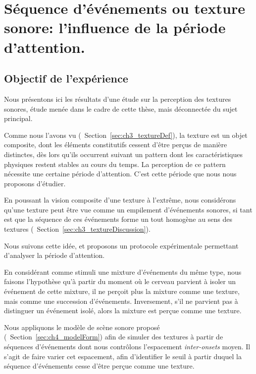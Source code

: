 \chapter[Expérience annexe: période d'attention]{Séquence d'événements ou texture sonore: l'influence de la période d'attention.}
\label{app:xp_texture}


\section{Objectif de l'expérience}

Nous présentons ici les résultats d'une étude sur la perception des textures sonores, étude menée dans le cadre de cette thèse, mais déconnectée du sujet principal. 

Comme nous l'avons vu (\cf~Section~\ref{sec:ch3_textureDef}), la texture est un objet composite, dont les éléments constitutifs cessent d'être perçus de manière distinctes, dès lors qu'ils occurrent suivant un pattern dont les caractéristiques physiques restent stables au cours du temps. La perception de ce pattern nécessite une certaine période d'attention. C'est cette période que nous nous proposons d'étudier.

En poussant la vision composite d'une texture à l’extrême, nous considérons qu'une texture peut être vue comme un empilement d'événements sonores, si tant est que la séquence de ces événements forme un tout homogène au sens des textures (\cf~Section~\ref{sec:ch3_textureDiscussion}). 

Nous suivons cette idée, et proposons un protocole expérimentale permettant d'analyser la période d'attention. 

En considérant comme stimuli une mixture d'événements du même type, nous faisons l'hypothèse qu'à partir du moment où le cerveau parvient à isoler un événement de cette mixture, il ne perçoit plus la mixture comme une texture, mais comme une succession d'événements. Inversement, s'il ne parvient pas à distinguer un événement isolé, alors la mixture est perçue comme une texture.

Nous appliquons le modèle de scène sonore proposé (\cf~Section~\ref{sec:ch4_modelForm}) afin de simuler des textures à partir de séquences d'événements dont nous contrôlons l'espacement \emph{inter-onsets} moyen. Il s'agit de faire varier cet espacement, afin d’identifier le seuil à partir duquel la séquence d'événements cesse d'être perçue comme une texture. 

